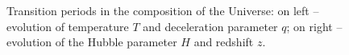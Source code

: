 \begin{figure}
\begin{minipage}{\linewidth}
\caption{Transition periods in the composition of the Universe: on left -- evolution of temperature $T$  and deceleration parameter $q$; on right --  evolution of the Hubble parameter $H$ and redshift $z$.
\label{fig:today} }
\end{minipage}
\end{figure}

